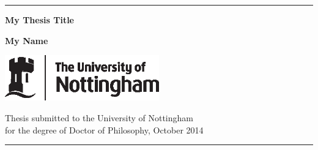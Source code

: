 %
%

\newcommand{\HRule}{\rule{\linewidth}{2mm}}
\begin{titlepage}

\begin{center}

\HRule


\LARGE{\textbf{My Thesis Title}}


\large{\textbf{My Name}}



\includegraphics[width=0.5\textwidth]{un_tf_blk.eps}


	Thesis submitted to the University of Nottingham\\
	for the degree of Doctor of Philosophy, October 2014\\


\HRule
\end{center}

\end{titlepage}


